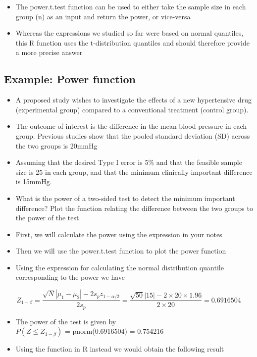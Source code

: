 \documentclass[
]{book}
\providecommand{\tightlist}{%
  \setlength{\itemsep}{0pt}\setlength{\parskip}{0pt}}
\begin{document}
\begin{itemize}
\tightlist
\item
  The power.t.test function can be used to either take the sample size in each group (n) as an input and return the power, or vice-versa
\item
  Whereas the expressions we studied so far were based on normal quantiles, this R function uses the t-distribution quantiles and should therefore provide a more precise answer
\end{itemize}

\hypertarget{example-power-function}{%
\subsection{Example: Power function}\label{example-power-function}}

\begin{itemize}
\item
  A proposed study wishes to investigate the effects of a new hypertensive drug (experimental group) compared to a conventional treatment (control group).
\item
  The outcome of interest is the difference in the mean blood pressure in each group. Previous studies show that the pooled standard deviation (SD) across the two groups is 20mmHg
\item
  Assuming that the desired Type I error is 5\% and that the feasible sample size is 25 in each group, and that the minimum clinically important difference is 15mmHg.
\item
  What is the power of a two-sided test to detect the minimum important difference? Plot the function relating the difference between the two groups to the power of the test
\item
  First, we will calculate the power using the expression in your notes
\item
  Then we will use the power.t.test function to plot the power function
\item
  Using the expression for calculating the normal distribution quantile corresponding to the power we have
\end{itemize}

\[Z_{1-\beta}=\frac{\sqrt N|\mu_1-\mu_2|-2s_pz_{1-\alpha/2}}{2s_p}=\frac{\sqrt{50}|15|-2\times 20\times 1.96}{2\times 20}=0.6916504\]

\begin{itemize}
\tightlist
\item
  The power of the test is given by\\
  \(P(Z\leq Z_{1-\beta})\) = pnorm(0.6916504) = 0.754216
\item
  Using the function in R instead we would obtain the following result
\end{itemize}
\end{document}
